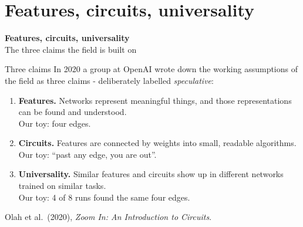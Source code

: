 \documentclass[aspectratio=169]{beamer}
\newcommand{\sectiontransition}[2]{%
  \begin{frame}[plain]
    \vfill
    \begin{center}
      {\Huge\bfseries\color{popblue} #1}\\[1.1em]
      {\large #2}
    \end{center}
    \vfill
  \end{frame}}
\begin{document}
\section{Features, circuits, universality}
\sectiontransition{Features, circuits, universality}{The three claims the field is built on}

\begin{frame}{Three claims}
  \vspace{0.4em}
  In 2020 a group at OpenAI wrote down the working assumptions of the field as three claims -
  deliberately labelled \emph{speculative}:

  \vspace{0.6em}
  \begin{enumerate}
    \item \textbf{Features.} Networks represent meaningful things, and those representations can be
      found and understood.\\
      {\small\color{gray} Our toy: four edges.}
    \item \textbf{Circuits.} Features are connected by weights into small, readable algorithms.\\
      {\small\color{gray} Our toy: ``past any edge, you are out''.}
    \item \textbf{Universality.} Similar features and circuits show up in different networks
      trained on similar tasks.\\
      {\small\color{gray} Our toy: 4 of 8 runs found the same four edges.}
  \end{enumerate}

  \vspace{0.6em}
  {\footnotesize Olah et al.\ (2020), \emph{Zoom In: An Introduction to Circuits}.}
\end{frame}
\end{document}
